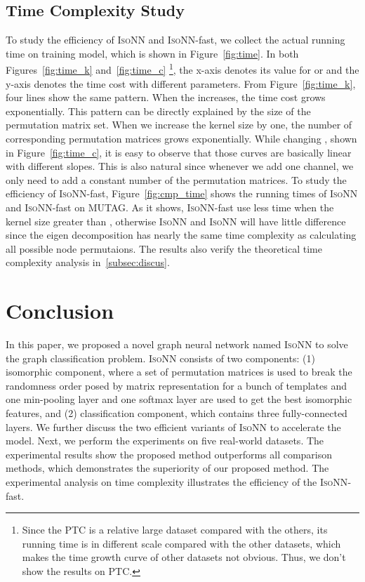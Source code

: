 \documentclass{article} \usepackage{iclr2020_conference,times}
\newcommand{\our}{\textsc{IsoNN}}
\newcommand{\ourfast}{\textsc{IsoNN}-fast}
\begin{document}
\subsection{Time Complexity Study}
\vspace*{-5pt}
To study the efficiency of {\our} and {\ourfast}, we collect the actual running time on training model, which is shown in Figure~\ref{fig:time}.  In both Figures~\ref{fig:time_k} and~\ref{fig:time_c} \footnote{Since the PTC is a relative large dataset compared with the others, its running time is in different scale compared with the other datasets, which makes the time growth curve of other datasets not obvious. Thus, we don't show the results on PTC.}, the x-axis denotes its value for  or  and the y-axis denotes the time cost with different parameters.  From Figure~\ref{fig:time_k}, four lines show the same pattern. When the  increases, the time cost grows exponentially. This pattern can be directly explained by the size of the permutation matrix set. When we increase the kernel size by one, the number of corresponding permutation matrices grows exponentially. While changing , shown in Figure~\ref{fig:time_c}, it is easy to observe that those curves are basically linear with different slopes. This is also natural since whenever we add one channel, we only need to add a constant number of the permutation matrices. To study the efficiency of {\ourfast}, Figure~\ref{fig:cmp_time} shows the running times of {\our} and {\ourfast} on MUTAG. As it shows,  {\ourfast} use less time when the kernel size greater than , otherwise {\our} and {\our} will have little difference since the eigen decomposition has nearly the same time complexity as calculating all possible node permutaions. The results also verify the theoretical time complexity analysis in~\ref{subsec:discus}.



 
\vspace{-10pt}
\section{Conclusion}\label{sec:conclusion}
\vspace{-5pt}
In this paper, we proposed a novel graph neural network named {\our} to solve the graph classification problem. {\our} consists of two components: (1) isomorphic component, where a set of permutation matrices is used to break the randomness order posed by matrix representation for a bunch of templates and one min-pooling layer and one softmax layer are used to get the best isomorphic features, and (2) classification component, which contains three fully-connected layers.  We further discuss the two efficient variants of {\our} to accelerate the model. Next, we perform the experiments on five real-world datasets. The experimental results show the proposed method outperforms all comparison methods, which demonstrates the superiority of our proposed method. The experimental analysis on time complexity illustrates the efficiency of the {\ourfast}. 


\end{document}
